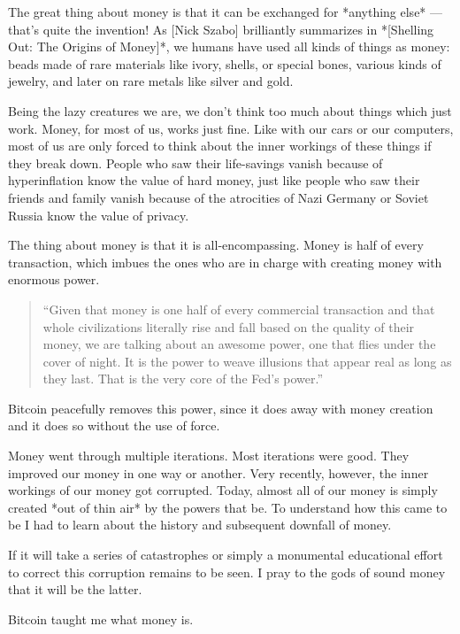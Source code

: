 The great thing about money is that it can be exchanged for *anything
else* --- that's quite the invention! As [Nick Szabo] brilliantly
summarizes in *[Shelling Out: The Origins of Money]*, we humans have
used all kinds of things as money: beads made of rare materials like
ivory, shells, or special bones, various kinds of jewelry, and later on
rare metals like silver and gold.

Being the lazy creatures we are, we don't think too much about things
which just work. Money, for most of us, works just fine. Like with our
cars or our computers, most of us are only forced to think about the
inner workings of these things if they break down. People who saw their
life-savings vanish because of hyperinflation know the value of hard
money, just like people who saw their friends and family vanish because
of the atrocities of Nazi Germany or Soviet Russia know the value of
privacy.

The thing about money is that it is all-encompassing. Money is half of
every transaction, which imbues the ones who are in charge with creating
money with enormous power.

\begin{quotation}
``Given that money is one half of every commercial transaction and that
whole civilizations literally rise and fall based on the quality of
their money, we are talking about an awesome power, one that flies
under the cover of night. It is the power to weave illusions that
appear real as long as they last. That is the very core of the
Fed's power.''
\end{quotation}

Bitcoin peacefully removes this power, since it does away with money
creation and it does so without the use of force.

Money went through multiple iterations. Most iterations were good. They
improved our money in one way or another. Very recently, however, the
inner workings of our money got corrupted. Today, almost all of our
money is simply created *out of thin air* by the powers that be. To
understand how this came to be I had to learn about the history and
subsequent downfall of money.

If it will take a series of catastrophes or simply a monumental
educational effort to correct this corruption remains to be seen. I pray
to the gods of sound money that it will be the latter.

Bitcoin taught me what money is.

%
%
%
%
